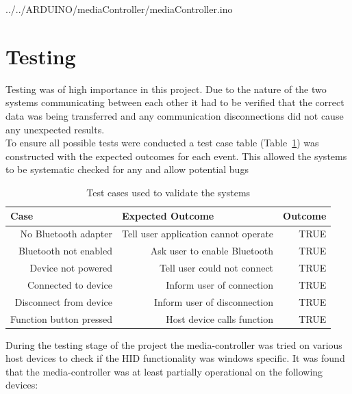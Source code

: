 \documentclass{article}
\begin{document}
			 {../../ARDUINO/mediaController/mediaController.ino}
			
	\section{Testing}
		
		Testing was of high importance in this project. Due to the nature of the two systems communicating between each other it had to be verified that the correct data was being transferred and any communication disconnections did not cause any unexpected results.\\
		
		\noindent
		To ensure all possible tests were conducted a test case table (Table~\ref{testCase}) was constructed with the expected outcomes for each event. This allowed the systems to be systematic checked for any and allow potential bugs
	
		\begin{table}[h]
			\centering
			\caption{Test cases used to validate the systems}
			\label{testCase}
			\begin{tabular}{|r|r|r|}
				\hline
				\multicolumn{1}{|l|}{Case} & \multicolumn{1}{l|}{Expected Outcome} & \multicolumn{1}{l|}{Outcome} \\ \hline
				No Bluetooth adapter      & Tell user application cannot operate          & TRUE                         \\
				Bluetooth not enabled     & Ask user to enable Bluetooth          & TRUE                         \\
				Device not powered         & Tell user could not connect           & TRUE                         \\
				Connected to device        & Inform user of connection             & TRUE                         \\
				Disconnect from device    & Inform user of disconnection          & TRUE                         \\
				Function button pressed    & Host device calls function            & TRUE                         \\ \hline
			\end{tabular}
		\end{table}
			
		\noindent
		During the testing stage of the project the media-controller was tried on various host devices to check if the HID functionality was windows specific. It was found that the media-controller was at least partially operational on the following devices:
		
\end{document}
